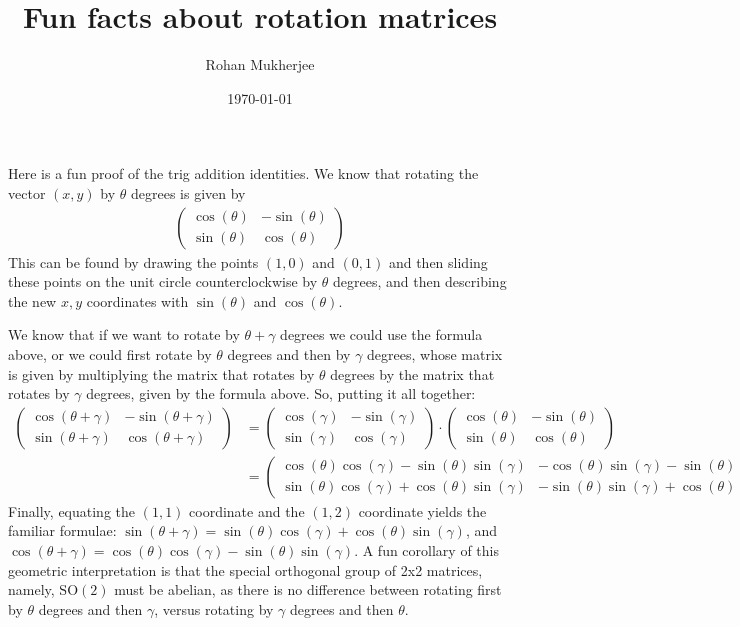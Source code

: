 \documentclass[12pt]{article}
\title{Fun facts about rotation matrices}
\date{\today}
\author{Rohan Mukherjee}
\theoremstyle{definition}
\theoremstyle{remark}
\begin{document}
	\maketitle
	Here is a fun proof of the trig addition identities. We know that rotating the vector $(x, y)$ by $\theta$ degrees is given by 
	\begin{align*}
		\begin{pmatrix}
			\cos(\theta) & -\sin(\theta) \\
			\sin(\theta) & \cos(\theta)
		\end{pmatrix}
	\end{align*}
	This can be found by drawing the points $(1, 0)$ and $(0, 1)$ and then sliding these points on the unit circle counterclockwise by $\theta$ degrees, and then describing the new $x,y$ coordinates with $\sin(\theta)$ and $\cos(\theta)$.
	
	We know that if we want to rotate by $\theta + \gamma$ degrees we could use the formula above, or we could first rotate by $\theta$ degrees and then by $\gamma$ degrees, whose matrix is given by multiplying the matrix that rotates by $\theta$ degrees by the matrix that rotates by $\gamma$ degrees, given by the formula above. So, putting it all together:
	\begin{align*}
		\begin{pmatrix}
			\cos(\theta+\gamma) & -\sin(\theta+\gamma) \\
			\sin(\theta+\gamma) & \cos(\theta+\gamma)
		\end{pmatrix}
		&=
		\begin{pmatrix}
			\cos(\gamma) & -\sin(\gamma) \\
			\sin(\gamma) & \cos(\gamma)
		\end{pmatrix} \cdot
		\begin{pmatrix}
			\cos(\theta) & -\sin(\theta) \\
			\sin(\theta) & \cos(\theta)
		\end{pmatrix}
	\\&=
	\begin{pmatrix}
		\cos(\theta)\cos(\gamma)-\sin(\theta)\sin(\gamma) & -\cos(\theta)\sin(\gamma)-\sin(\theta)\cos(\gamma) \\
		\sin(\theta)\cos(\gamma)+\cos(\theta)\sin(\gamma) & -\sin(\theta)\sin(\gamma)+\cos(\theta)\cos(\gamma)
	\end{pmatrix}
	\end{align*}
	Finally, equating the $(1,1)$ coordinate and the $(1, 2)$ coordinate yields the familiar formulae: $\sin(\theta+\gamma) = \sin(\theta)\cos(\gamma)+\cos(\theta)\sin(\gamma)$, and $\cos(\theta+\gamma) = \cos(\theta)\cos(\gamma)-\sin(\theta)\sin(\gamma)$. A fun corollary of this geometric interpretation is that the special orthogonal group of 2x2 matrices, namely, $\mathrm{SO}(2)$ must be abelian, as there is no difference between rotating first by $\theta$ degrees and then $\gamma$, versus rotating by $\gamma$ degrees and then $\theta$.
	
\end{document}
